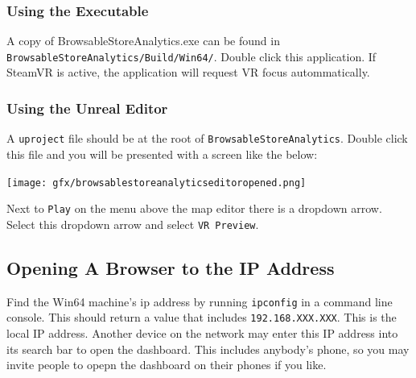 \subsubsection{Using the Executable}\label{using-the-executable}

A copy of BrowsableStoreAnalytics.exe can be found in
\texttt{BrowsableStoreAnalytics/Build/Win64/}. Double click this
application. If SteamVR is active, the application will request VR focus
autommatically.

\subsubsection{Using the Unreal Editor}\label{using-the-unreal-editor}

A \texttt{uproject} file should be at the root of
\texttt{BrowsableStoreAnalytics}. Double click this file and you will be
presented with a screen like the below:

\texttt{[image: gfx/browsablestoreanalyticseditoropened.png]}

Next to \texttt{Play} on the menu above the map editor there is a
dropdown arrow. Select this dropdown arrow and select
\texttt{VR\ Preview}.

\subsection{Opening A Browser to the IP
Address}\label{opening-a-browser-to-the-ip-address}

Find the Win64 machine's ip address by running \texttt{ipconfig} in a
command line console. This should return a value that includes
\texttt{192.168.XXX.XXX}. This is the local IP address. Another device
on the network may enter this IP address into its search bar to open the
dashboard. This includes anybody's phone, so you may invite people to
opepn the dashboard on their phones if you like.
